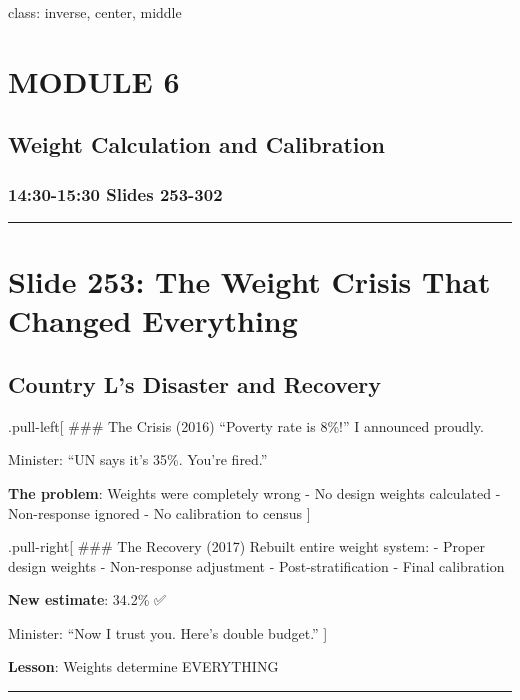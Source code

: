 \documentclass[
]{article}
\begin{document}
class: inverse, center, middle

\section{MODULE 6}\label{module-6}

\subsection{Weight Calculation and
Calibration}\label{weight-calculation-and-calibration}

\subsubsection{14:30-15:30 \textbar{} Slides
253-302}\label{slides-253-302}

\begin{center}\rule{0.5\linewidth}{0.5pt}\end{center}

\section{Slide 253: The Weight Crisis That Changed
Everything}\label{slide-253-the-weight-crisis-that-changed-everything}

\subsection{Country L's Disaster and
Recovery}\label{country-ls-disaster-and-recovery}

.pull-left{[} \#\#\# The Crisis (2016) ``Poverty rate is 8\%!'' I
announced proudly.

Minister: ``UN says it's 35\%. You're fired.''

\textbf{The problem}: Weights were completely wrong - No design weights
calculated - Non-response ignored - No calibration to census {]}

.pull-right{[} \#\#\# The Recovery (2017) Rebuilt entire weight system:
- Proper design weights - Non-response adjustment - Post-stratification
- Final calibration

\textbf{New estimate}: 34.2\% ✅

Minister: ``Now I trust you. Here's double budget.'' {]}

\textbf{Lesson}: Weights determine EVERYTHING

\begin{center}\rule{0.5\linewidth}{0.5pt}\end{center}
\end{document}
